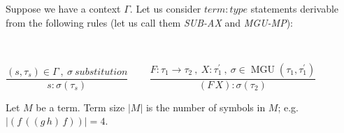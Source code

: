 \documentclass[a4paper,oneside]{memoir}
\begin{document}
\newcommand{\then}{\Rightarrow}
\newcommand{\E}[2]{(\exists #1)\ #2}
\newcommand{\A}[2]{(\forall #1)\ #2}
\newcommand{\Ain}[3]{(\forall #1 \in #2)\ #3}


\newcommand{\op}{\operatorname}

\newcommand{\ar}{\rightarrow}
\newcommand{\ap}[2]{(#1\,#2)}
\newcommand{\defi}{\coloneqq}
\newcommand{\defe}{\mathrel{\vcentcolon\equiv}}

\newcommand{\binRule}[3]{\dfrac{#1\ ,\ #2}{#3}}
\newcommand{\triRule}[4]{\dfrac{#1\ ,\ #2\ , \ #3}{#4}}
\newcommand{\isSub}[1]{#1\ \mathit{substitution}}
\newcommand{\MGU}[2]{\op{MGU}(#1,#2)}
\newcommand{\mgu}[1]{\op{MGU}(#1)}

\newcommand{\AX}{\textit{AX}\xspace}
\newcommand{\subAx}{\textit{SUB-AX}\xspace}
\newcommand{\mguMp}{\textit{MGU-MP}\xspace}
\newcommand{\abs}[1]{\lvert #1 \rvert}

Suppose we have a context $\Gamma$. Let us consider $\mathit{term:type}$ statements derivable from the following rules (let us call them \subAx and \mguMp):

~

$\binRule{(s,\tau_s) \in \Gamma}{\isSub{\sigma}}{s : \sigma(\tau_s)}$
~~~
$\triRule{F : \tau_1 \ar \tau_2}{X : \tau^\prime_1}{\sigma \in \MGU{\tau_1}{\tau^\prime_1}}{\ap{F}{X} : \sigma(\tau_2)}$


\begin{definition}
Let $M$ be a term. Term size $\abs{M}$ is the number of symbols in $M$; e.g. $\abs{\ap{f}{\ap{\ap{g}{h}}{f}}} = 4$. 
\end{definition}

\newcommand{\inhab}[1]{\op{I}(#1)}

\newcommand{\tord}{\preccurlyeq}
\newcommand{\stord}{\prec}
\newcommand{\ordt}{\tord_\tau}
\newcommand{\tek}{\sim}
\newcommand{\ntek}{\nsim}
\newcommand{\ekt}{\tek_\tau}
\newcommand{\nekt}{\ntek_\tau}
\newcommand{\nsucct}{\nsucc_\tau}

\newcommand{\MGI}[1]{\op{MGI}(#1)}
\newcommand{\MGIt}{\MGI{\tau}}
\newcommand{\It}{\op{I}(\tau)}

\newcommand{\ids}{\sigma_{\op{id}}}

\newcommand{\U}[2]{\op{U}(#1,#2)}
\newcommand{\Utt}{\U{\tau}{\tauPr}}
\newcommand{\MGUtt}{\MGU{\tau}{\tauPr}}

\newcommand{\e}[2]{\op{E}_{#1}(#2)}
\newcommand{\restrict}[2]{{#1}_{\mid #2}}
\newcommand{\fresh}[2]{\op{fresh}_{#1}(#2)}
\newcommand{\newVar}[1]{\op{newVar}(#1)}
\newcommand{\Ss}[1]{\op{ss}(#1)}
\newcommand{\TS}[2]{\op{ts}_{#1}(#2)}
\newcommand{\ts}[2]{\op{ts}_{#1}(#2)}
\newcommand{\TSij}[3]{\op{ts}_{#1,#2}(#3)}
\newcommand{\trees}[2]{\op{trees}_{#1}(#2)}
\newcommand{\FX}{\ap{F}{X}}
\newcommand{\sF}{\s_{F}}
\newcommand{\sX}{\s_{X}}
\newcommand{\vars}[1]{\op{vars}(#1)}
\newcommand{\dom}[1]{\op{dom}(#1)}
\newcommand{\IH}{induction hypothesis\xspace}
\newcommand{\discup}{~\mathbin{\dot{\cup}}~}
\end{document}
